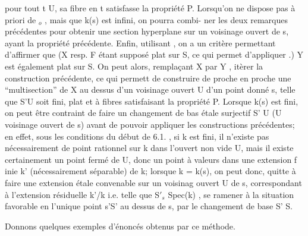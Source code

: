 pour tout t \hand{$\in$}U,  sa fibre  en  t satisfasse la propriété P.  Lorsqu'on ne
dispose pas à priori de \hand{$\xi$}$_{o}$ ,  mais que k(s) est infini, on pourra combi-%
ner les deux remarques précédentes pour obtenir une section hyperplane
sur un voisinage ouvert de s, ayant la propriété précédente.  Enfin,
utilisant  , on a un critère permettant d'affirmer que (X resp. F étant
supposé plat sur S, ce qui permet d'appliquer .)  Y\hand{$_{\xi}$}  est également
plat sur S. On peut alors, remplaçant X par Y\hand{$_{\xi}$} , itèrer la construction
précédente, ce qui permett  de construire de proche en proche une
``multisection''  de X au dessus d'un voisinage ouvert U d'un point donné s,
telle que S'\hand{$\longrightarrow$}U soit fini, plat et à fibres satisfaisant la propriété P.
Lorsque k(s) est fini, on peut être contraint de faire un changement de bas%
étale surjectif S'\hand{$\longrightarrow$} U (U voisinage ouvert de s) avant de pouvoir appliquer
les constructions précédentes; en effet, sous les conditions du début de
6.1. , si k est fini, il n'existe pas nécessairement de point rationnel sur
k dans  l'ouvert non vide U, mais 
il existe certainement un point fermé de U, donc un point à valeurs dans
une extension f inie k' (nécessairement séparable) de k; lorsque k = k(s),
on peut donc, quitte à faire une extension  étale convenable  sur un voisinag%
ouvert U de  s, correspondant à l'extension résiduelle k'/k
i.e. telle que  S$'_{s}$ \hand{$\xrightarrow{\sim}$}Spec(k) , se ramener à la situation favorable 
en l'unique point s'\hand{$\in$}S' au dessus de s, par le changement de base S'\hand{$\to$} S.

Donnons quelques exemples d'énoncés obtenus par ce méthode. 
%
%
%
%
